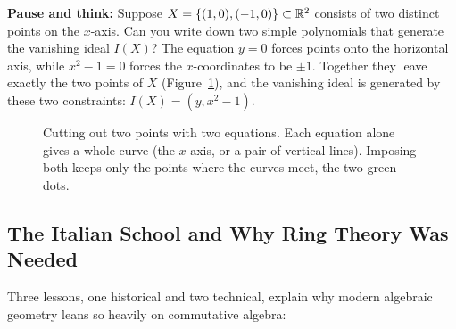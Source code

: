 \begin{recoverybox}
\textbf{Pause and think:} Suppose $X = \{(1, 0), (-1, 0)\} \subset \mathbb{R}^2$ consists of two distinct points on the $x$-axis. Can you write down two simple polynomials that generate the vanishing ideal $I(X)$? The equation $y = 0$ forces points onto the horizontal axis, while $x^2 - 1 = 0$ forces the $x$-coordinates to be $\pm 1$. Together they leave exactly the two points of $X$ (Figure~\ref{alggeom:fig-two-points}), and the vanishing ideal is generated by these two constraints: $I(X) = (y, x^2 - 1)$.
\end{recoverybox}

\begin{figure}[htbp]
\centering
{}
\caption{Cutting out two points with two equations. Each equation alone gives a whole curve (the $x$-axis, or a pair of vertical lines). Imposing both keeps only the points where the curves meet, the two green dots.}\label{alggeom:fig-two-points}
\end{figure}

\subsection{The Italian School and Why Ring Theory Was Needed}

Three lessons, one historical and two technical, explain why modern algebraic geometry leans so heavily on commutative algebra:

